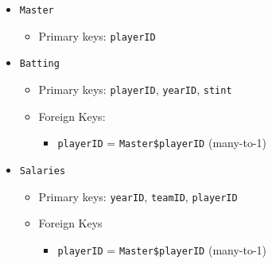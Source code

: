 \documentclass[]{book}
\providecommand{\tightlist}{%
  \setlength{\itemsep}{0pt}\setlength{\parskip}{0pt}}
\theoremstyle{plain}
\theoremstyle{remark}
\begin{document}
\begin{itemize}
\item
  \texttt{Master}

  \begin{itemize}
  \tightlist
  \item
    Primary keys: \texttt{playerID}
  \end{itemize}
\item
  \texttt{Batting}

  \begin{itemize}
  \item
    Primary keys: \texttt{playerID}, \texttt{yearID}, \texttt{stint}
  \item
    Foreign Keys:

    \begin{itemize}
    \tightlist
    \item
      \texttt{playerID} = \texttt{Master\$playerID} (many-to-1)
    \end{itemize}
  \end{itemize}
\item
  \texttt{Salaries}

  \begin{itemize}
  \item
    Primary keys: \texttt{yearID}, \texttt{teamID}, \texttt{playerID}
  \item
    Foreign Keys

    \begin{itemize}
    \tightlist
    \item
      \texttt{playerID} = \texttt{Master\$playerID} (many-to-1)
    \end{itemize}
  \end{itemize}
\end{itemize}
\end{document}
